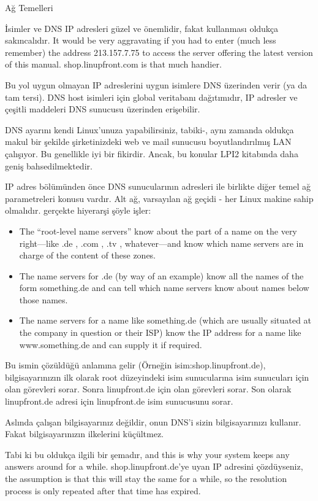 \begin{section}{Ağ Temelleri}
\begin{subsection}{İsimler ve DNS}
IP adresleri güzel ve önemlidir, fakat kullanması oldukça sakıncalıdır. It would be very aggravating if you had to enter (much less remember) the address 213.157.7.75 to access the server offering the latest version of this manual. shop.linupfront.com is that much handier.

Bu yol uygun olmayan IP adreslerini uygun isimlere DNS üzerinden verir (ya da tam tersi). DNS host isimleri için global veritabanı dağıtımıdır, IP adresler ve çeşitli maddeleri DNS sunucusu üzerinden erişebilir.

DNS ayarını kendi Linux'unuza yapabilirsiniz, tabiki-, aynı zamanda oldukça makul bir şekilde şirketinizdeki web ve mail sunucusu boyutlandırılmış LAN çalışıyor. Bu genellikle iyi bir fikirdir. Ancak, bu konular LPI2 kitabında daha geniş bahsedilmektedir.

IP adres bölümünden önce DNS sunucularının adresleri ile birlikte diğer temel ağ parametreleri konusu vardır. Alt ağ, varsayılan ağ geçidi - her Linux makine sahip olmalıdır. gerçekte hiyerarşi şöyle işler:

\begin{itemize}
\item The “root-level name servers” know about the part of a name on the very right—like .de , .com , .tv , whatever—and know which name servers are in charge of the content of these zones.
\item The name servers for .de (by way of an example) know all the names of the form something.de and can tell which name servers know about names below those names.
\item The name servers for a name like something.de (which are usually situated at the company in question or their ISP) know the IP address for a name like www.something.de and can supply it if required.
\end{itemize}

Bu ismin çözüldüğü anlamına gelir (Örneğin isim:shop.linupfront.de), bilgisayarınızın ilk olarak root düzeyindeki isim sunucularına isim sunucuları için olan görevleri sorar. Sonra linupfront.de için olan görevleri sorar. Son olarak linupfront.de adresi için linupfront.de isim sunucusunu sorar.

Aslında çalışan bilgisayarınız değildir, onun DNS'i sizin bilgisayarınızı kullanır. Fakat bilgisayarınızın ilkelerini küçültmez.

Tabi ki bu oldukça ilgili bir şemadır, and this is why your system keeps any answers around for a while. shop.linupfront.de'ye uyan IP adresini çözdüyseniz, the assumption is that this will stay the same for a while, so the resolution process is only repeated after that time has expired.


\end{subsection}
\end{section}
